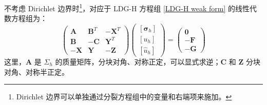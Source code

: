 不考虑 Dirichlet 边界时\footnote{Dirichlet 边界可以单独通过分裂方程组中的变量和右端项来施加。}，对应于 LDG-H 方程组 \eqref{LDG-H weak form} 的线性代数方程组为：
\begin{equation}\label{LDG-H linear equations}
	\begin{pmatrix}
		\bm A & \bm B^T & -\bm X^T \\
		\bm B & -\bm C & \bm Y^T \\
		-\bm X & \bm Y & -\bm Z
	\end{pmatrix}
	\begin{pmatrix}
		[\bm\sigma_{h}] \\
		[u_{h}] \\
		[\widehat{u}_{h}]
	\end{pmatrix}
	= \begin{pmatrix}
		\bm 0 \\
		-\bm F \\
		-\bm G
	\end{pmatrix}
\end{equation}
这里，\(\bm A\) 是 \(\Sigma_{h}\) 的质量矩阵，分块对角、对称正定，可以显式求逆；\(\bm C\) 和 \(\bm Z\) 分块对角、对称半正定。

